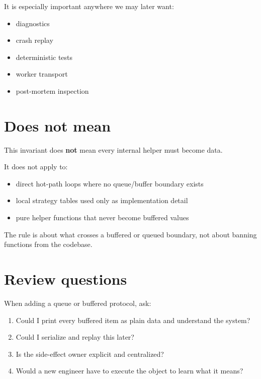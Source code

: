 It is especially important anywhere we may later want:

\begin{itemize}
\tightlist
\item
  diagnostics
\item
  crash replay
\item
  deterministic tests
\item
  worker transport
\item
  post-mortem inspection
\end{itemize}

\section{Does not mean}\label{record-036-does-not-mean}

This invariant does \textbf{not} mean every internal helper must become data.

It does not apply to:

\begin{itemize}
\tightlist
\item
  direct hot-path loops where no queue/buffer boundary exists
\item
  local strategy tables used only as implementation detail
\item
  pure helper functions that never become buffered values
\end{itemize}

The rule is about what crosses a buffered or queued boundary, not about banning functions from the codebase.

\section{Review questions}\label{record-036-review-questions}

When adding a queue or buffered protocol, ask:

\begin{enumerate}
\def\labelenumi{\arabic{enumi}.}
\tightlist
\item
  Could I print every buffered item as plain data and understand the system?
\item
  Could I serialize and replay this later?
\item
  Is the side-effect owner explicit and centralized?
\item
  Would a new engineer have to execute the object to learn what it means?
\end{enumerate}

